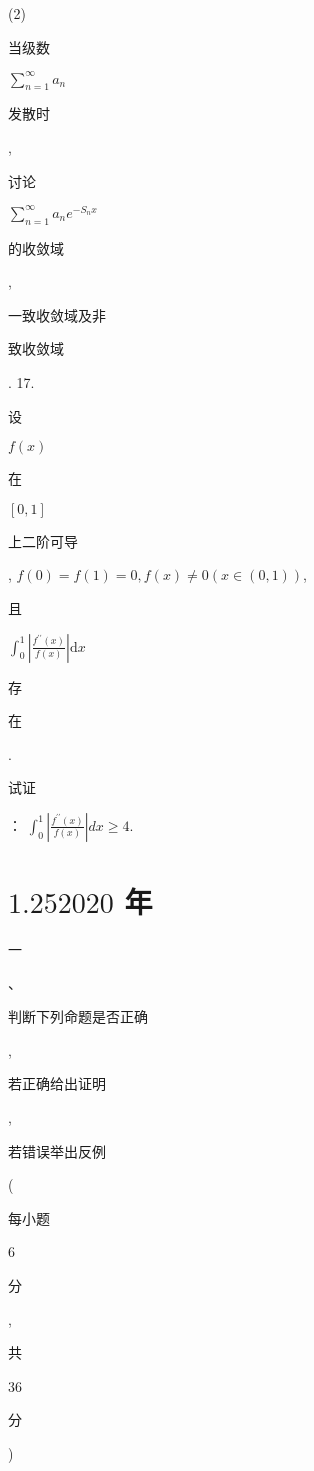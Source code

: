 \documentclass[10pt]{article}
\begin{document}
(2) \begin{CJK}{UTF8}{mj}当级数\end{CJK} $\sum_{n=1}^{\infty} a_{n}$ \begin{CJK}{UTF8}{mj}发散时\end{CJK}, \begin{CJK}{UTF8}{mj}讨论\end{CJK} $\sum_{n=1}^{\infty} a_{n} e^{-S_{n} x}$ \begin{CJK}{UTF8}{mj}的收敛域\end{CJK}, \begin{CJK}{UTF8}{mj}一致收敛域及非\end{CJK} \begin{CJK}{UTF8}{mj}致收敛域\end{CJK}. 17. \begin{CJK}{UTF8}{mj}设\end{CJK} $f(x)$ \begin{CJK}{UTF8}{mj}在\end{CJK} $[0,1]$ \begin{CJK}{UTF8}{mj}上二阶可导\end{CJK}, $f(0)=f(1)=0, f(x) \neq 0(x \in(0,1))$, \begin{CJK}{UTF8}{mj}且\end{CJK} $\int_{0}^{1}\left|\frac{f^{\prime \prime}(x)}{f(x)}\right| \mathrm{d} x$ \begin{CJK}{UTF8}{mj}存\end{CJK} \begin{CJK}{UTF8}{mj}在\end{CJK}. \begin{CJK}{UTF8}{mj}试证\end{CJK}： $\int_{0}^{1}\left|\frac{f^{\prime \prime}(x)}{f(x)}\right| d x \geqslant 4$.

\section{$1.252020$ 年}
\begin{CJK}{UTF8}{mj}一\end{CJK}、\begin{CJK}{UTF8}{mj}判断下列命题是否正确\end{CJK}, \begin{CJK}{UTF8}{mj}若正确给出证明\end{CJK}, \begin{CJK}{UTF8}{mj}若错误举出反例\end{CJK} (\begin{CJK}{UTF8}{mj}每小题\end{CJK} 6 \begin{CJK}{UTF8}{mj}分\end{CJK}, \begin{CJK}{UTF8}{mj}共\end{CJK} 36 \begin{CJK}{UTF8}{mj}分\end{CJK})
\end{document}
